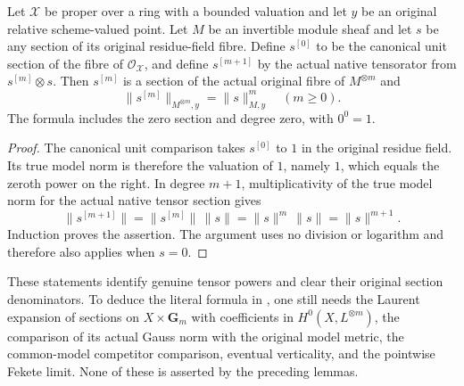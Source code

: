\begin{lemma}
\label{lem:tc-seven-generic-power-norm}
Let $\mathcal X$ be proper over a ring with a bounded valuation and
let $y$ be an original relative scheme-valued point.  Let $M$ be an
invertible module sheaf and let $s$ be any section of its original
residue-field fibre.  Define $s^{[0]}$ to be the canonical unit
section of the fibre of $\mathcal O_{\mathcal X}$, and define
$s^{[m+1]}$ by the actual native tensorator from
$s^{[m]}\otimes s$.  Then $s^{[m]}$ is a section of the actual
original fibre of $M^{\otimes m}$ and
\[
 \lVert s^{[m]}\rVert_{M^{\otimes m},y}
   =\lVert s\rVert_{M,y}^{m}
 \quad(m\geq0).
\]
The formula includes the zero section and degree zero, with $0^0=1$.
\leanok
\end{lemma}
\begin{proof}
The canonical unit comparison takes $s^{[0]}$ to $1$ in the
original residue field.  Its true model norm is therefore the
valuation of $1$, namely $1$, which equals the zeroth power on the
right.  In degree $m+1$, multiplicativity of the true model norm for
the actual native tensor section gives
\[
 \lVert s^{[m+1]}\rVert
  =\lVert s^{[m]}\rVert\,\lVert s\rVert
  =\lVert s\rVert^m\,\lVert s\rVert
  =\lVert s\rVert^{m+1}.
\]
Induction proves the assertion.  The argument uses no division or
logarithm and therefore also applies when $s=0$.
\end{proof}

\begin{remark}
These statements identify genuine tensor powers and clear their original
section denominators.  To deduce the literal formula in
\cite[Proposition~2.5]{FHX}, one still needs
the Laurent expansion of sections on $X\times\mathbf G_m$ with
coefficients in $H^0(X,L^{\otimes m})$, the comparison of its actual
Gauss norm with the original model metric, the common-model
competitor comparison, eventual verticality, and the pointwise Fekete
limit.  None of these is asserted by the preceding lemmas.
\end{remark}
